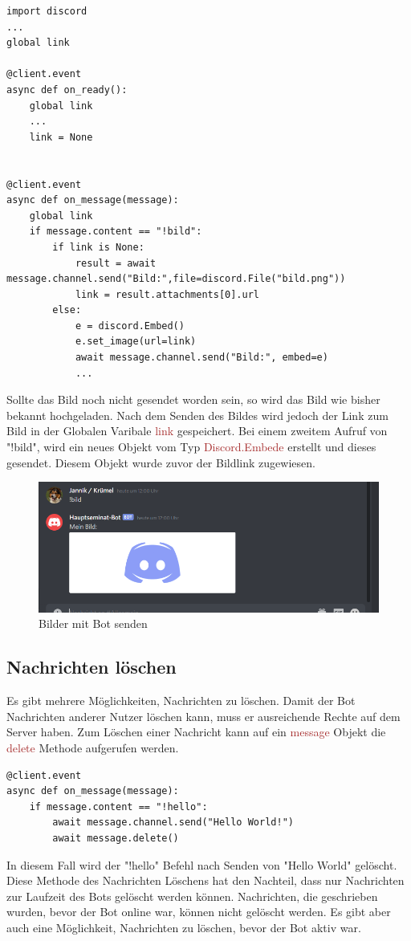 \documentclass[sigplan,screen]{acmart}
\begin{document}
\begin{lstlisting}
import discord
...
global link

@client.event
async def on_ready():
    global link
    ...
    link = None


@client.event
async def on_message(message):
    global link
    if message.content == "!bild":
        if link is None:
            result = await message.channel.send("Bild:",file=discord.File("bild.png"))
            link = result.attachments[0].url
        else:
            e = discord.Embed()
            e.set_image(url=link)
            await message.channel.send("Bild:", embed=e)
            ...
\end{lstlisting} 
Sollte das Bild noch nicht gesendet worden sein, so wird das Bild wie bisher bekannt hochgeladen. Nach dem Senden des Bildes wird jedoch der Link zum Bild in der Globalen Varibale \textcolor{brown}{link} gespeichert. Bei einem zweitem Aufruf von "!bild", wird ein neues Objekt vom Typ \textcolor{brown}{Discord.Embede} erstellt und dieses gesendet. Diesem Objekt wurde zuvor der Bildlink zugewiesen. 

\begin{figure}[h]
  \centering
  \includegraphics[width=\linewidth]{discord_bild}
  \caption{Bilder mit Bot senden}
\end{figure}


\subsection{Nachrichten löschen}
Es gibt mehrere Möglichkeiten, Nachrichten zu löschen. Damit der Bot Nachrichten anderer Nutzer löschen kann, muss er ausreichende Rechte auf dem Server haben. Zum Löschen einer Nachricht kann auf ein \textcolor{brown}{message} Objekt die \textcolor{brown}{delete} Methode aufgerufen werden.

\newpage

\begin{lstlisting}
@client.event
async def on_message(message):
    if message.content == "!hello":
        await message.channel.send("Hello World!")
        await message.delete()      
\end{lstlisting} 
In diesem Fall wird der "!hello" Befehl nach Senden von "Hello World" gelöscht. Diese Methode des Nachrichten Löschens hat den Nachteil, dass nur Nachrichten zur Laufzeit des Bots gelöscht werden können. Nachrichten, die geschrieben wurden, bevor der Bot online war, können nicht gelöscht werden. Es gibt aber auch eine Möglichkeit, Nachrichten zu löschen, bevor der Bot aktiv war.
\end{document}
